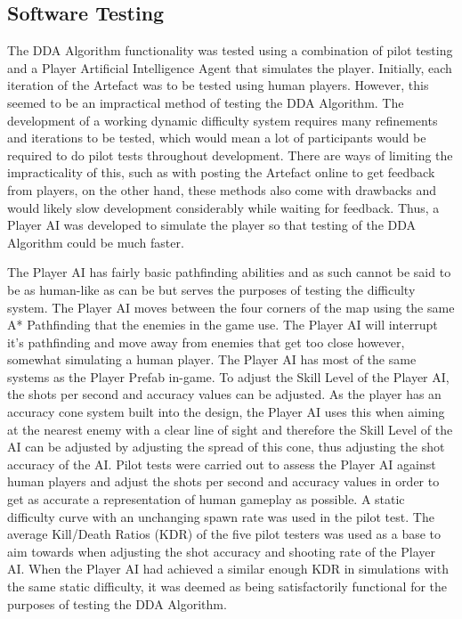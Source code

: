 \documentclass[journal]{IEEEtran}
\begin{document}
\subsection{Software Testing}

The DDA Algorithm functionality was tested using a combination of pilot testing and a Player Artificial Intelligence Agent that simulates the player. Initially, each iteration of the Artefact was to be tested using human players. However, this seemed to be an impractical method of testing the DDA Algorithm. The development of a working dynamic difficulty system requires many refinements and iterations to be tested, which would mean a lot of participants would be required to do pilot tests throughout development. There are ways of limiting the impracticality of this, such as with posting the Artefact online to get feedback from players, on the other hand, these methods also come with drawbacks and would likely slow development considerably while waiting for feedback. Thus, a Player AI was developed to simulate the player so that testing of the DDA Algorithm could be much faster. 

The Player AI has fairly basic pathfinding abilities and as such cannot be said to be as human-like as can be but serves the purposes of testing the difficulty system. The Player AI moves between the four corners of the map using the same A* Pathfinding that the enemies in the game use. The Player AI will interrupt it's pathfinding and move away from enemies that get too close however, somewhat simulating a human player. The Player AI has most of the same systems as the Player Prefab in-game. To adjust the Skill Level of the Player AI, the shots per second and accuracy values can be adjusted. As the player has an accuracy cone system built into the design, the Player AI uses this when aiming at the nearest enemy with a clear line of sight and therefore the Skill Level of the AI can be adjusted by adjusting the spread of this cone, thus adjusting the shot accuracy of the AI. Pilot tests were carried out to assess the Player AI against human players and adjust the shots per second and accuracy values in order to get as accurate a representation of human gameplay as possible. A static difficulty curve with an unchanging spawn rate was used in the pilot test. The average Kill/Death Ratios (KDR) of the five pilot testers was used as a base to aim towards when adjusting the shot accuracy and shooting rate of the Player AI. When the Player AI had achieved a similar enough KDR in simulations with the same static difficulty, it was deemed as being satisfactorily functional for the purposes of testing the DDA Algorithm.
\end{document}
